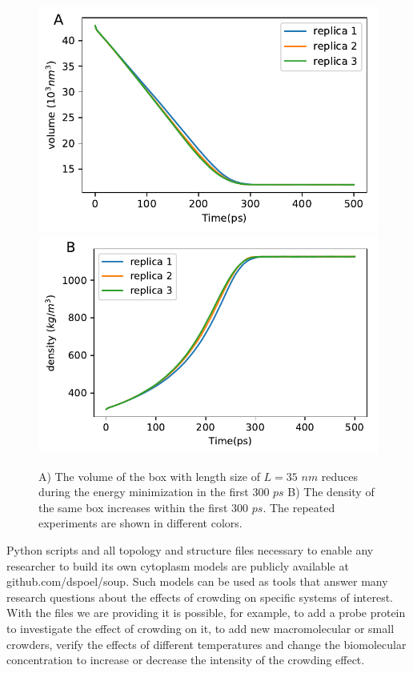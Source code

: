 \documentclass[journal=jacsat,manuscript=article]{achemso}
\begin{document}
\begin{figure}[H]
\includegraphics[scale=0.5]{shrinking_volume.pdf} 
\includegraphics[scale=0.5]{shrinking_density.pdf} 
\caption{A) The volume of the box with length size of $L=35 \,\, nm$ reduces during the energy minimization in the first $300 \,\, ps$ B) The density of the same box increases within the first $300\,\, ps$. The repeated experiments are shown in different colors. }
\end{figure}



Python scripts and all topology and structure files necessary to enable any researcher to build its own cytoplasm models are publicly available at github.com/dspoel/soup. Such models can be used as tools that answer many research questions about the effects of crowding on specific systems of interest. With the files we are providing it is possible, for example, to add a probe protein to investigate the effect of crowding on it, to add new macromolecular or small crowders, verify the effects of different temperatures and change the biomolecular concentration to increase or decrease the intensity of the crowding effect.
\end{document}
